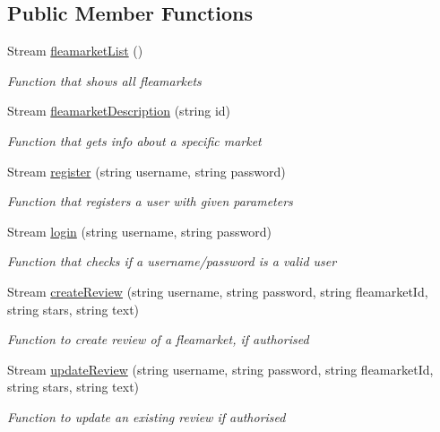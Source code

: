 \subsection*{Public Member Functions}
\begin{DoxyCompactItemize}
\item 
Stream \hyperlink{class_service_library_1_1_rest_service_a5ac245dc76449e578d8f47df0344332a}{fleamarket\-List} ()
\begin{DoxyCompactList}\small\item\em Function that shows all fleamarkets \end{DoxyCompactList}\item 
Stream \hyperlink{class_service_library_1_1_rest_service_aafc5b16ec37b4b2d75d57335fc155650}{fleamarket\-Description} (string id)
\begin{DoxyCompactList}\small\item\em Function that gets info about a specific market \end{DoxyCompactList}\item 
Stream \hyperlink{class_service_library_1_1_rest_service_a099ea56300324e0f53b447469579e363}{register} (string username, string password)
\begin{DoxyCompactList}\small\item\em Function that registers a user with given parameters \end{DoxyCompactList}\item 
Stream \hyperlink{class_service_library_1_1_rest_service_a31577832960f1aaf0c93f81e5134272a}{login} (string username, string password)
\begin{DoxyCompactList}\small\item\em Function that checks if a username/password is a valid user \end{DoxyCompactList}\item 
Stream \hyperlink{class_service_library_1_1_rest_service_a0121954034b57e8947b9c5ce65479f65}{create\-Review} (string username, string password, string fleamarket\-Id, string stars, string text)
\begin{DoxyCompactList}\small\item\em Function to create review of a fleamarket, if authorised \end{DoxyCompactList}\item 
Stream \hyperlink{class_service_library_1_1_rest_service_a7623f407a00d3bc2f93b12168c7674b5}{update\-Review} (string username, string password, string fleamarket\-Id, string stars, string text)
\begin{DoxyCompactList}\small\item\em Function to update an existing review if authorised \end{DoxyCompactList}\item 

\end{DoxyCompactItemize}
